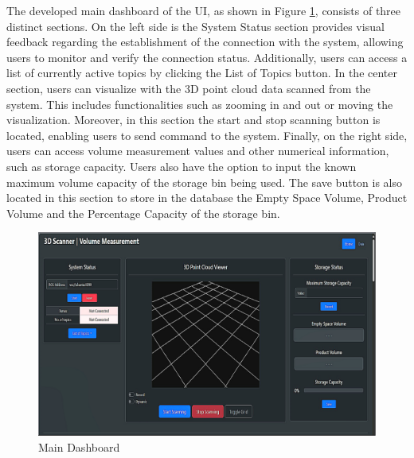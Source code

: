 The developed main dashboard of the UI, as shown in Figure \ref{ch4:fig:main-dashboard}, consists of three distinct sections. On the left side is the System Status section provides visual feedback regarding the establishment of the connection with the system, allowing users to monitor and verify the connection status. Additionally, users can access a list of currently active topics by clicking the List of Topics button. In the center section, users can visualize with the 3D point cloud data scanned from the system. This includes functionalities such as zooming in and out or moving the visualization. Moreover, in this section the start and stop scanning button is located, enabling users to send command to the system. Finally, on the right side, users can access volume measurement values and other numerical information, such as storage capacity. Users also have the option to input the known maximum volume capacity of the storage bin being used. The save button is also located in this section to store in the database the Empty Space Volume, Product Volume and the Percentage Capacity of the storage bin. \\

\begin{figure}[H]
	\centering
	\includegraphics[width=1\textwidth]{Figures/main-dashboard-resize-phone}
	\caption{Main Dashboard}
	\label{ch4:fig:main-dashboard}
\end{figure}

